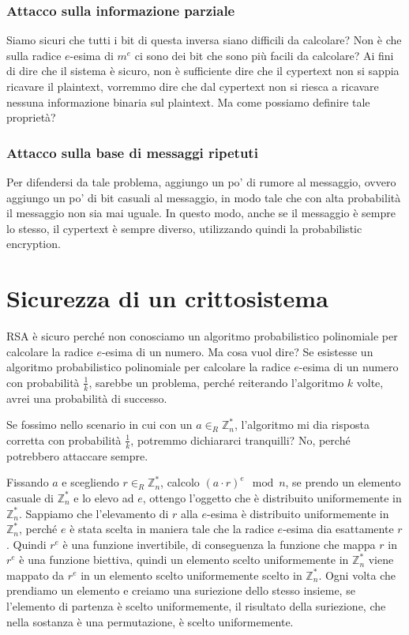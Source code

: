 \subsubsection{Attacco sulla informazione parziale}
Siamo sicuri che tutti i bit di questa inversa siano difficili da calcolare?
Non è che sulla radice $e$-esima di $m^e$ ci sono dei bit che sono più facili 
da calcolare? Ai fini di dire che il sistema è sicuro, non è 
sufficiente dire che il cypertext non si sappia ricavare il plaintext,
vorremmo dire che dal cypertext non si riesca a ricavare nessuna informazione 
binaria sul plaintext. Ma come possiamo definire tale proprietà?
\subsubsection{Attacco sulla base di messaggi ripetuti}
Per difendersi da tale problema, aggiungo un po' di rumore al messaggio,
ovvero aggiungo un po' di bit casuali al messaggio, in modo tale che con 
alta probabilità il messaggio non sia mai uguale. In questo modo, anche se
il messaggio è sempre lo stesso, il cypertext è sempre diverso, utilizzando 
quindi la probabilistic encryption.
\section{Sicurezza di un crittosistema}
RSA è sicuro perché non conosciamo un algoritmo probabilistico polinomiale 
per calcolare la radice $e$-esima di un numero. Ma cosa vuol dire?
Se esistesse un algoritmo probabilistico polinomiale per calcolare la radice 
$e$-esima di un numero con probabilità $\frac{1}{k}$, sarebbe un problema,
perché reiterando l'algoritmo $k$ volte, avrei una probabilità di successo.

Se fossimo nello scenario in cui con un $a\in_R \mathbb{Z}_n^*$, l'algoritmo 
mi dia risposta corretta con probabilità $\frac{1}{k}$, potremmo dichiararci 
tranquilli? No, perché potrebbero attaccare sempre.

Fissando $a$ e scegliendo $r \in_R \mathbb{Z}_n^*$, calcolo $(a\cdot r)^e \mod n$,
se prendo un elemento casuale di $\mathbb{Z}_n^*$ e lo elevo ad $e$, ottengo
l'oggetto che è distribuito uniformemente in $\mathbb{Z}_n^*$. Sappiamo che
l'elevamento di $r$ alla $e$-esima è distribuito uniformemente in $\mathbb{Z}_n^*$, 
perché $e$ è stata scelta in maniera tale che la radice $e$-esima dia esattamente 
$r$. Quindi $r^e$ è una funzione invertibile, di conseguenza la funzione che mappa $r$ in 
$r^e$ è una funzione biettiva, quindi un elemento scelto uniformemente in $\mathbb{Z}_n^*$
viene mappato da $r^e$ in un elemento scelto uniformemente scelto in $\mathbb{Z}_n^*$.
Ogni volta che prendiamo un elemento e creiamo una suriezione dello stesso insieme, 
se l'elemento di partenza è scelto uniformemente, il risultato della suriezione, che nella 
sostanza è una permutazione, è scelto uniformemente.


